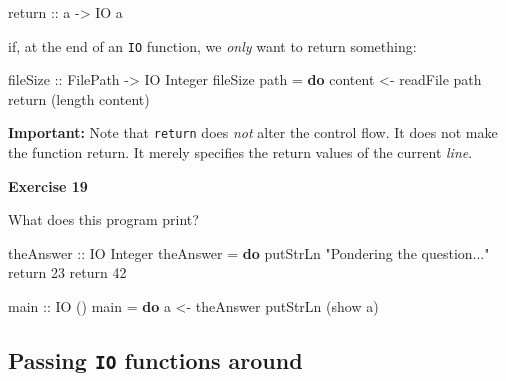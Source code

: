 \documentclass[11pt,
  american,
  DIV13]{article}
\newenvironment{Shaded}{}{}
\newcommand{\DataTypeTok}[1]{\textcolor[rgb]{0.56,0.13,0.00}{#1}}
\newcommand{\DecValTok}[1]{\textcolor[rgb]{0.25,0.63,0.44}{#1}}
\newcommand{\FunctionTok}[1]{\textcolor[rgb]{0.02,0.16,0.49}{#1}}
\newcommand{\KeywordTok}[1]{\textcolor[rgb]{0.00,0.44,0.13}{\textbf{#1}}}
\newcommand{\NormalTok}[1]{#1}
\newcommand{\OtherTok}[1]{\textcolor[rgb]{0.00,0.44,0.13}{#1}}
\newcommand{\StringTok}[1]{\textcolor[rgb]{0.25,0.44,0.63}{#1}}
\begin{document}
\begin{Shaded}
\begin{Highlighting}[]
\FunctionTok{return}\OtherTok{ ::}\NormalTok{ a }\OtherTok{{-}\textgreater{}} \DataTypeTok{IO}\NormalTok{ a}
\end{Highlighting}
\end{Shaded}

if, at the end of an \texttt{IO} function, we \emph{only} want to return
something:

\begin{Shaded}
\begin{Highlighting}[]
\OtherTok{fileSize ::} \DataTypeTok{FilePath} \OtherTok{{-}\textgreater{}} \DataTypeTok{IO} \DataTypeTok{Integer}
\NormalTok{fileSize path }\OtherTok{=} \KeywordTok{do}
\NormalTok{  content }\OtherTok{\textless{}{-}} \FunctionTok{readFile}\NormalTok{ path}
  \FunctionTok{return}\NormalTok{ (}\FunctionTok{length}\NormalTok{ content)}
\end{Highlighting}
\end{Shaded}

\textbf{Important:} Note that \texttt{return} does \emph{not} alter the
control flow. It does not make the function return. It merely specifies
the return values of the current \emph{line}.

\textbf{Exercise 19}

What does this program print?

\begin{Shaded}
\begin{Highlighting}[]
\OtherTok{theAnswer ::} \DataTypeTok{IO} \DataTypeTok{Integer}
\NormalTok{theAnswer }\OtherTok{=} \KeywordTok{do}
  \FunctionTok{putStrLn} \StringTok{"Pondering the question..."}
  \FunctionTok{return} \DecValTok{23}
  \FunctionTok{return} \DecValTok{42}

\OtherTok{main ::} \DataTypeTok{IO}\NormalTok{ ()}
\NormalTok{main }\OtherTok{=} \KeywordTok{do}
\NormalTok{  a }\OtherTok{\textless{}{-}}\NormalTok{ theAnswer}
  \FunctionTok{putStrLn}\NormalTok{ (}\FunctionTok{show}\NormalTok{ a)}
\end{Highlighting}
\end{Shaded}

\hypertarget{passing-io-functions-around}{%
\subsection{\texorpdfstring{Passing \texttt{IO} functions
around}{Passing IO functions around}}\label{passing-io-functions-around}}
\end{document}
